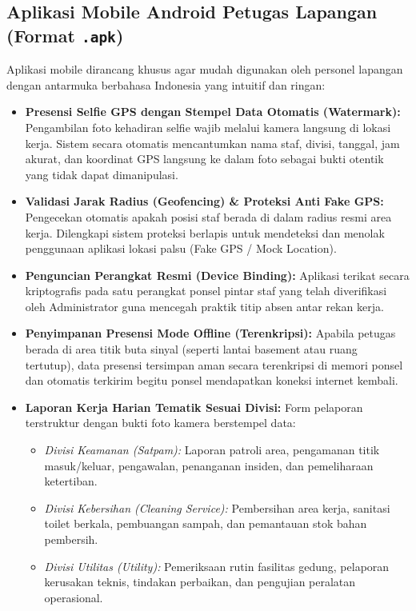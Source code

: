 \documentclass[11pt,a4paper]{article}
\begin{document}
\subsection{Aplikasi Mobile Android Petugas Lapangan (Format \texttt{.apk})}
Aplikasi mobile dirancang khusus agar mudah digunakan oleh personel lapangan dengan antarmuka berbahasa Indonesia yang intuitif dan ringan:
\begin{itemize}
    \item \textbf{Presensi Selfie GPS dengan Stempel Data Otomatis (Watermark):} Pengambilan foto kehadiran selfie wajib melalui kamera langsung di lokasi kerja. Sistem secara otomatis mencantumkan nama staf, divisi, tanggal, jam akurat, dan koordinat GPS langsung ke dalam foto sebagai bukti otentik yang tidak dapat dimanipulasi.
    \item \textbf{Validasi Jarak Radius (Geofencing) \& Proteksi Anti Fake GPS:} Pengecekan otomatis apakah posisi staf berada di dalam radius resmi area kerja. Dilengkapi sistem proteksi berlapis untuk mendeteksi dan menolak penggunaan aplikasi lokasi palsu (Fake GPS / Mock Location).
    \item \textbf{Penguncian Perangkat Resmi (Device Binding):} Aplikasi terikat secara kriptografis pada satu perangkat ponsel pintar staf yang telah diverifikasi oleh Administrator guna mencegah praktik titip absen antar rekan kerja.
    \item \textbf{Penyimpanan Presensi Mode Offline (Terenkripsi):} Apabila petugas berada di area titik buta sinyal (seperti lantai basement atau ruang tertutup), data presensi tersimpan aman secara terenkripsi di memori ponsel dan otomatis terkirim begitu ponsel mendapatkan koneksi internet kembali.
    \item \textbf{Laporan Kerja Harian Tematik Sesuai Divisi:} Form pelaporan terstruktur dengan bukti foto kamera berstempel data:
    \begin{itemize}
        \item \textit{Divisi Keamanan (Satpam):} Laporan patroli area, pengamanan titik masuk/keluar, pengawalan, penanganan insiden, dan pemeliharaan ketertiban.
        \item \textit{Divisi Kebersihan (Cleaning Service):} Pembersihan area kerja, sanitasi toilet berkala, pembuangan sampah, dan pemantauan stok bahan pembersih.
        \item \textit{Divisi Utilitas (Utility):} Pemeriksaan rutin fasilitas gedung, pelaporan kerusakan teknis, tindakan perbaikan, dan pengujian peralatan operasional.

\end{itemize}
\end{itemize}
\end{document}
